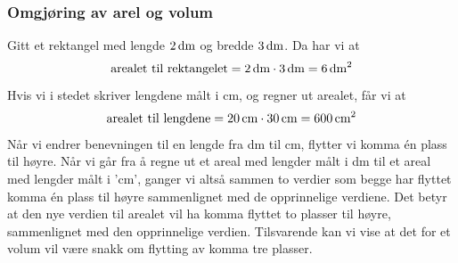 \subsubsection*{Omgjøring av arel og volum}
Gitt et rektangel med lengde $2\,\text{dm}$ og bredde $3\,\text{dm}$. Da har vi at
\[ \text{arealet til rektangelet}=2\,\text{dm}\cdot3\,\text{dm}=6\,\text{dm}^2 \]
Hvis vi i stedet skriver lengdene målt i cm, og regner ut arealet, får vi at
\[ \text{arealet til lengdene}=20\,\text{cm}\cdot30\,\text{cm}=600\,\text{cm}^2 \]
Når vi endrer benevningen til en lengde fra dm til cm, flytter vi komma én plass til høyre. Når vi går fra å regne ut et areal med lengder målt i dm til et areal med lengder målt i 'cm', ganger vi altså sammen to verdier som begge har flyttet komma én plass til høyre sammenlignet med de opprinnelige verdiene. Det betyr at den nye verdien til arealet vil ha komma flyttet to plasser til høyre, sammenlignet med den opprinnelige verdien. Tilsvarende kan vi vise at det for et volum vil være snakk om flytting av komma tre plasser.

 \regv





